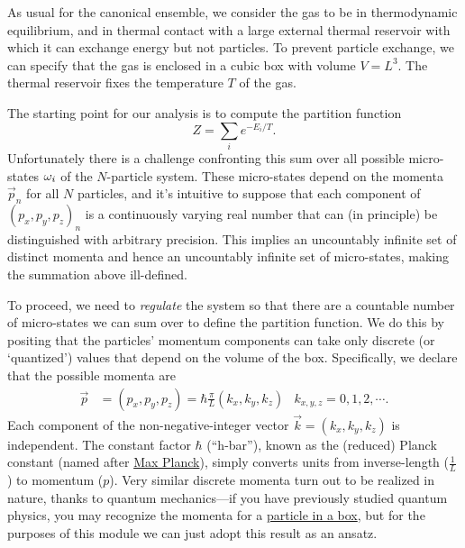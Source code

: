 As usual for the canonical ensemble, we consider the gas to be in thermodynamic equilibrium, and in thermal contact with a large external thermal reservoir with which it can exchange energy but not particles.
To prevent particle exchange, we can specify that the gas is enclosed in a cubic box with volume $V = L^3$.
The thermal reservoir fixes the temperature $T$ of the gas.

The starting point for our analysis is to compute the partition function
\begin{equation*}
  Z = \sum_i e^{-E_i / T}.
\end{equation*}
Unfortunately there is a challenge confronting this sum over all possible micro-states $\omega_i$ of the $N$-particle system.
These micro-states depend on the momenta $\vec{p}_n$ for all $N$ particles, and it's intuitive to suppose that each component of $(p_x, p_y, p_z)_n$ is a continuously varying real number that can (in principle) be distinguished with arbitrary precision.
This implies an uncountably infinite set of distinct momenta and hence an uncountably infinite set of micro-states, making the summation above ill-defined.

To proceed, we need to \textit{regulate} the system so that there are a countable number of micro-states we can sum over to define the partition function.
We do this by positing that the particles' momentum components can take only discrete (or `quantized') values that depend on the volume of the box.
Specifically, we declare that the possible momenta are
\begin{align}
  \label{eq:quant_mom}
  \vec p & = (p_x, p_y, p_z) = \hbar \frac{\pi}{L} (k_x, k_y, k_z) &
  k_{x, y, z} = 0, 1, 2, \cdots.
\end{align}
Each component of the non-negative-integer vector $\vec k = (k_x, k_y, k_z)$ is independent.
The constant factor $\hbar$ (``h-bar''), known as the (reduced) Planck constant (named after \href{https://en.wikipedia.org/wiki/Max_Planck}{Max Planck}), simply converts units from inverse-length ($\frac{1}{L}$) to momentum ($p$).
Very similar discrete momenta turn out to be realized in nature, thanks to quantum mechanics---if you have previously studied quantum physics, you may recognize the momenta for a \href{https://en.wikipedia.org/wiki/Particle_in_a_box}{particle in a box}, but for the purposes of this module we can just adopt this result as an ansatz. %

